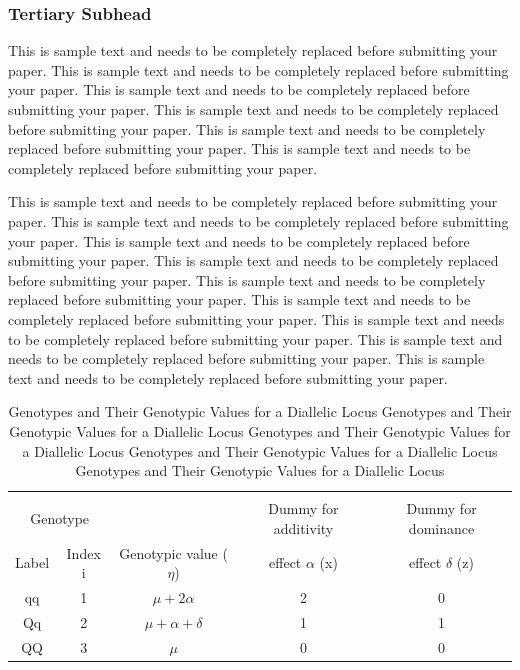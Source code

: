 \documentclass[11pt]{asaproc}
\begin{document}
\subsubsection{Tertiary Subhead}


This is sample text and needs to be completely replaced before submitting your paper. This is sample text and needs to be completely replaced before submitting your paper. This is sample text and needs to be completely replaced before submitting your paper. This is sample text and needs to be completely replaced before submitting your paper. This is sample text and needs to be completely replaced before submitting your paper. This is sample text and needs to be completely replaced before submitting your paper.

This is sample text and needs to be completely replaced before submitting your paper. This is sample text and needs to be completely replaced before submitting your paper. This is sample text and needs to be completely replaced before submitting your paper. This is sample text and needs to be completely replaced before submitting your paper. This is sample text and needs to be completely replaced before submitting your paper. This is sample text and needs to be completely replaced before submitting your paper. This is sample text and needs to be completely replaced before submitting your paper. This is sample text and needs to be completely replaced before submitting your paper. This is sample text and needs to be completely replaced before submitting your paper. 

\begin{table}
\caption{Genotypes and Their Genotypic Values for a Diallelic Locus Genotypes and Their Genotypic Values for a Diallelic Locus Genotypes and Their Genotypic Values for a Diallelic Locus Genotypes and Their Genotypic Values for a Diallelic Locus Genotypes and Their Genotypic Values for a Diallelic Locus }
\begin{center}
\begin{tabular}{ccccc}
\hline
\hline
\\[-5pt]
\multicolumn{2}{c}{Genotype} & &
\multicolumn{1}{c}{Dummy for additivity} &
\multicolumn{1}{c}{Dummy for dominance }\\
\multicolumn{1}{c}{Label} &    
\multicolumn{1}{c}{Index i} &
\multicolumn{1}{c}{Genotypic value ($\eta$)}&
\multicolumn{1}{c}{effect $\alpha$ (x)} &
\multicolumn{1}{c}{effect $\delta$ (z)}\\
\hline
qq      &1&     $\mu + \mbox{2}\alpha$  & 2&    0\\
Qq&     2&      $\mu + \alpha + \delta$&        1       &1\\
QQ&     3&      $\mu$&  0&      0\\
\hline
\end{tabular}
\end{center}
\end{table}
\end{document}
